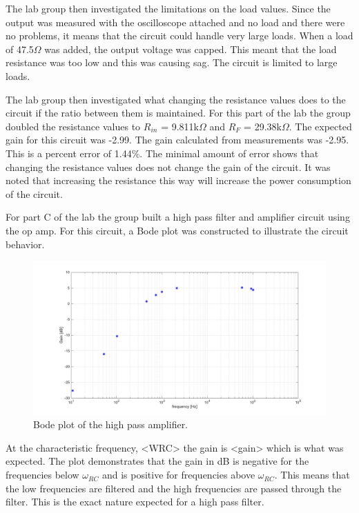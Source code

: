 \documentclass[twocolumn, amsmath]{revtex4}
\begin{document}
The lab group then investigated the limitations on the load values. Since the output was measured with the oscilloscope attached and no load and there were no problems, it means that the circuit could handle very large loads. When a load of 47.5$\Omega$ was added, the output voltage was capped. This meant that the load resistance was too low and this was causing sag. The circuit is limited to large loads. 

The lab group then investigated what changing the resistance values does to the circuit if the ratio between them is maintained. For this part of the lab the group doubled the resistance values to $R_{in}$ = 9.811k$\Omega$ and $R_{F}$ = 29.38k$\Omega$. The expected gain for this circuit was -2.99. The gain calculated from measurements was -2.95. This is a percent error of  1.44\%. The minimal amount of error shows that changing the resistance values does not change the gain of the circuit. It was noted that increasing the resistance this way will increase the power consumption of the circuit.

For part C of the lab the group built a high pass filter and amplifier circuit using the op amp. For this circuit, a Bode plot was constructed to illustrate the circuit behavior.

\begin{figure}[h]
    \includegraphics[scale=0.15]{bode_plot.jpg}  
    \caption{Bode plot of the high pass amplifier.}
\end{figure}

At the characteristic frequency, <WRC> the gain is <gain> which is what was expected. The plot demonstrates that the gain in dB is negative for the frequencies below $\omega_{RC}$ and is positive for frequencies above $\omega_{RC}$. This means that the low frequencies are filtered and the high frequencies are passed through the filter. This is the exact nature expected for a high pass filter.
\end{document}
